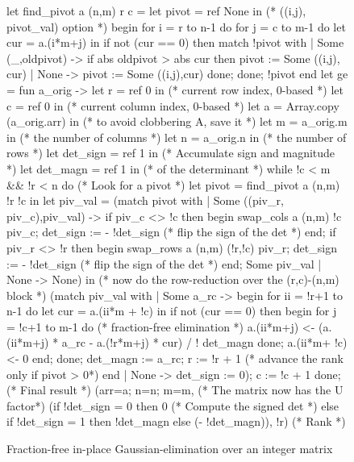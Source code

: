\documentclass{elsart}
\begin{document}
\begin{figure}
\begin{code}[numbers=left,numberblanklines=false,fontsize=\scriptsize]
let find_pivot a (n,m) r c =
  let pivot = ref None in               (* ((i,j), pivot_val) option *)
  begin
  for i = r to n-1 do
    for j = c to m-1 do
      let cur = a.(i*m+j) in
      if not (cur == 0) then
        match !pivot with
        | Some (_,oldpivot) ->
            if abs oldpivot > abs cur then
               pivot := Some ((i,j), cur)
        | None -> pivot := Some ((i,j),cur)
  done; done;
  !pivot
  end
let ge = fun a_orig ->
  let r = ref 0 in                    (* current row index, 0-based *)
  let c = ref 0 in                    (* current column index, 0-based *)
  let a = Array.copy (a_orig.arr) in  (* to avoid clobbering A, save it *)
  let m = a_orig.m in                 (* the number of columns *)
  let n = a_orig.n in                 (* the number of rows *)
  let det_sign = ref 1 in             (* Accumulate sign and magnitude *)
  let det_magn = ref 1 in             (*   of the determinant *)
  while !c < m && !r < n do
    (* Look for a pivot *)
    let pivot = find_pivot a (n,m) !r !c in
    let piv_val = (match  pivot with
    | Some ((piv_r, piv_c),piv_val) ->
        if piv_c <> !c then
          begin
            swap_cols a (n,m) !c piv_c;
            det_sign := - !det_sign (* flip the sign of the det *)
          end;
        if piv_r <> !r then
          begin
            swap_rows a (n,m) (!r,!c) piv_r;
            det_sign := - !det_sign (* flip the sign of the det *)
          end;
        Some piv_val
    | None -> None) in
    (* now do the row-reduction over the (r,c)-(n,m) block *)
    (match piv_val with
    | Some a_rc -> begin
        for ii = !r+1 to n-1 do
          let cur = a.(ii*m + !c) in
          if not (cur == 0)  then
            begin
              for j = !c+1 to m-1 do
                (* fraction-free elimination *)
                a.(ii*m+j) <- (a.(ii*m+j) * a_rc - a.(!r*m+j) * cur) / ! det_magn
              done;
              a.(ii*m+ !c) <- 0
            end;
        done;
        det_magn := a_rc;
        r := !r + 1                 (* advance the rank only if pivot > 0*)
      end
    | None -> det_sign := 0);
    c := !c + 1
    done;
    (* Final result *)
    ({arr=a; n=n; m=m},                 (* The matrix now has the U factor*)
    (if      !det_sign = 0 then  0      (* Compute the signed det *)
     else if !det_sign = 1 then  !det_magn 
     else                        (- !det_magn)),
    !r)                                 (* Rank *)
\end{code}
\caption{Fraction-free in-place Gaussian-elimination over an integer
  matrix}\label{fig:GE-algorithm}
\end{figure}
\end{document}
